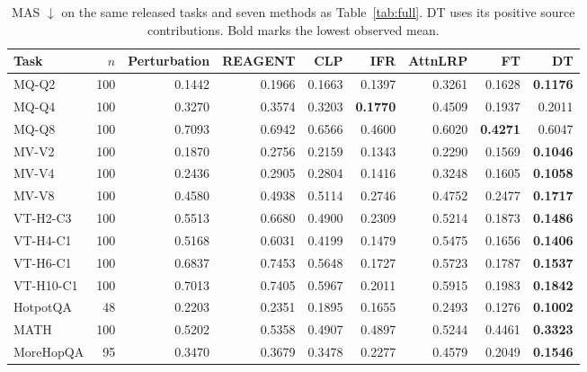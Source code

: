 \begin{table}[t]
\centering\small
\caption{MAS $\downarrow$ on the same released tasks and seven methods as Table~\ref{tab:full}. DT uses its positive source contributions. Bold marks the lowest observed mean.}
\label{tab:mas}
\setlength{\tabcolsep}{3.0pt}
\begin{tabular}{@{}lr rrrrrrr@{}}
\toprule
Task & $n$ & Perturbation & REAGENT & CLP & IFR & AttnLRP & FT & DT \\
\midrule
MQ-Q2 & 100 & 0.1442 & 0.1966 & 0.1663 & 0.1397 & 0.3261 & 0.1628 & \textbf{0.1176} \\
MQ-Q4 & 100 & 0.3270 & 0.3574 & 0.3203 & \textbf{0.1770} & 0.4509 & 0.1937 & 0.2011 \\
MQ-Q8 & 100 & 0.7093 & 0.6942 & 0.6566 & 0.4600 & 0.6020 & \textbf{0.4271} & 0.6047 \\
MV-V2 & 100 & 0.1870 & 0.2756 & 0.2159 & 0.1343 & 0.2290 & 0.1569 & \textbf{0.1046} \\
MV-V4 & 100 & 0.2436 & 0.2905 & 0.2804 & 0.1416 & 0.3248 & 0.1605 & \textbf{0.1058} \\
MV-V8 & 100 & 0.4580 & 0.4938 & 0.5114 & 0.2746 & 0.4752 & 0.2477 & \textbf{0.1717} \\
\midrule
VT-H2-C3 & 100 & 0.5513 & 0.6680 & 0.4900 & 0.2309 & 0.5214 & 0.1873 & \textbf{0.1486} \\
VT-H4-C1 & 100 & 0.5168 & 0.6031 & 0.4199 & 0.1479 & 0.5475 & 0.1656 & \textbf{0.1406} \\
VT-H6-C1 & 100 & 0.6837 & 0.7453 & 0.5648 & 0.1727 & 0.5723 & 0.1787 & \textbf{0.1537} \\
VT-H10-C1 & 100 & 0.7013 & 0.7405 & 0.5967 & 0.2011 & 0.5915 & 0.1983 & \textbf{0.1842} \\
\midrule
HotpotQA & 48 & 0.2203 & 0.2351 & 0.1895 & 0.1655 & 0.2493 & 0.1276 & \textbf{0.1002} \\
MATH & 100 & 0.5202 & 0.5358 & 0.4907 & 0.4897 & 0.5244 & 0.4461 & \textbf{0.3323} \\
MoreHopQA & 95 & 0.3470 & 0.3679 & 0.3478 & 0.2277 & 0.4579 & 0.2049 & \textbf{0.1546} \\
\bottomrule
\end{tabular}
\end{table}

